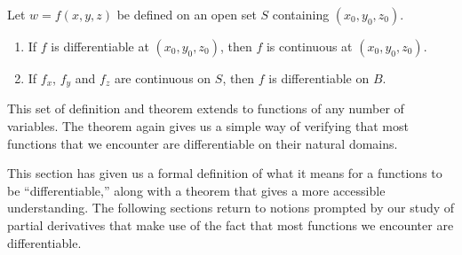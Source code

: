 {Let $w=f(x,y,z)$ be defined on an open set $S$ containing $(x_0,y_0,z_0)$. 
\begin{enumerate}
\item	If $f$ is differentiable at $(x_0,y_0,z_0)$, then $f$ is continuous at $(x_0,y_0,z_0)$.
\item If $f_x$, $f_y$  and $f_z$ are continuous on $S$, then $f$ is differentiable on $B$.
\end{enumerate}}

This set of definition and theorem extends to functions of any number of variables. The theorem again gives us a simple way of verifying that most functions that we encounter are differentiable on their natural domains.\bigskip

This section has given us a formal definition of what it means for a functions to be ``differentiable,'' along with a theorem that gives a more accessible understanding. The following sections return to notions prompted by our study of partial derivatives that make use of the fact that most functions we encounter are differentiable.

